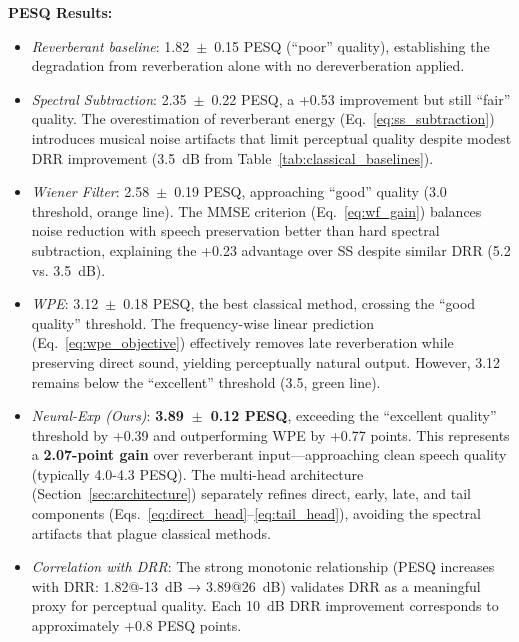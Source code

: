 \documentclass[12pt,a4paper]{article}
\begin{document}
\textbf{PESQ Results:}
\begin{itemize}
\item \textit{Reverberant baseline}: 1.82~$\pm$~0.15 PESQ (``poor'' quality), establishing the degradation from reverberation alone with no dereverberation applied.

\item \textit{Spectral Subtraction}: 2.35~$\pm$~0.22 PESQ, a +0.53 improvement but still ``fair'' quality. The overestimation of reverberant energy (Eq.~\eqref{eq:ss_subtraction}) introduces musical noise artifacts that limit perceptual quality despite modest DRR improvement (3.5~dB from Table~\ref{tab:classical_baselines}).

\item \textit{Wiener Filter}: 2.58~$\pm$~0.19 PESQ, approaching ``good'' quality (3.0 threshold, orange line). The MMSE criterion (Eq.~\eqref{eq:wf_gain}) balances noise reduction with speech preservation better than hard spectral subtraction, explaining the +0.23 advantage over SS despite similar DRR (5.2 vs. 3.5~dB).

\item \textit{WPE}: 3.12~$\pm$~0.18 PESQ, the best classical method, crossing the ``good quality'' threshold. The frequency-wise linear prediction (Eq.~\eqref{eq:wpe_objective}) effectively removes late reverberation while preserving direct sound, yielding perceptually natural output. However, 3.12 remains below the ``excellent'' threshold (3.5, green line).

\item \textit{Neural-Exp (Ours)}: \textbf{3.89~$\pm$~0.12 PESQ}, exceeding the ``excellent quality'' threshold by +0.39 and outperforming WPE by +0.77 points. This represents a \textbf{2.07-point gain} over reverberant input---approaching clean speech quality (typically 4.0-4.3 PESQ). The multi-head architecture (Section~\ref{sec:architecture}) separately refines direct, early, late, and tail components (Eqs.~\eqref{eq:direct_head}--\eqref{eq:tail_head}), avoiding the spectral artifacts that plague classical methods.

\item \textit{Correlation with DRR}: The strong monotonic relationship (PESQ increases with DRR: 1.82@-13~dB → 3.89@26~dB) validates DRR as a meaningful proxy for perceptual quality. Each 10~dB DRR improvement corresponds to approximately +0.8 PESQ points.
\end{itemize}
\end{document}
